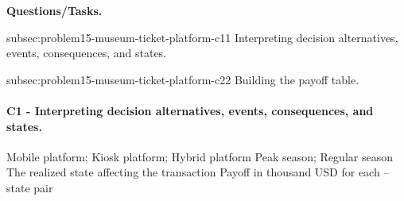 	\textbf{Questions/Tasks.}
	\begin{enumerate}
	\CriterionTask
	{subsec:problem15-museum-ticket-platform-c1}{1}
	{Interpreting decision alternatives, events, consequences, and states.}

	\CriterionTask
	{subsec:problem15-museum-ticket-platform-c2}{2}
	{Building the payoff table.}
	\end{enumerate}

	\paragraph*{C1 - Interpreting decision alternatives, events, consequences, and states.}
	\label{subsec:problem15-museum-ticket-platform-c1}
	\DecisionElementsTable
	{Mobile platform; Kiosk platform; Hybrid platform}
	{Peak season; Regular season}
	{The realized state affecting the transaction}
	{Payoff in thousand USD for each --state pair}

